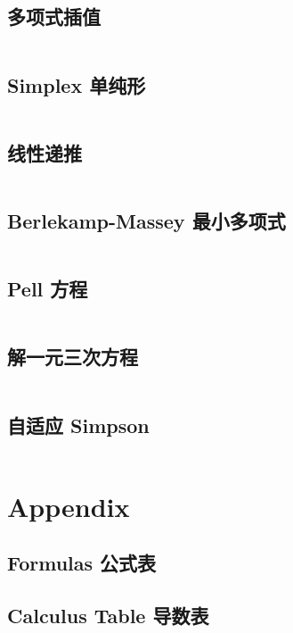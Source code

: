 \documentclass[titlepage, a4paper]{article}
\newcommand\nothing{}
\renewcommand{\checkmark}[0]{\nothing}
\begin{document}
\begin{multicols}{2}
\begin{spacing}{0.6}
				\subsection{多项式插值}
				\inputminted{cpp}{src/Math/插值.cpp}
				\subsection{Simplex 单纯形\checkmark}
				\inputminted{cpp}{src/Math/Simplex.cpp}
				\subsection{线性递推}
				\inputminted{cpp}{src/Math/线性递推.cpp}
				\subsection{Berlekamp-Massey 最小多项式}
				\inputminted{cpp}{src/Math/Berlekamp-Massey.cpp}
				\subsection{Pell 方程}
				\inputminted{cpp}{src/Math/Pell方程.cpp}
				\subsection{解一元三次方程}
				\inputminted{cpp}{src/Math/解一元三次方程.cpp}
				\subsection{自适应 Simpson}
				\inputminted{cpp}{src/Math/Simpson.cpp}
		
			
			\section{Appendix}
				\begin{spacing}{0.5}
				\subsection{Formulas 公式表}
				
				\subsection{Calculus Table 导数表}
				

\end{spacing}
\end{spacing}
\end{multicols}
\end{document}
